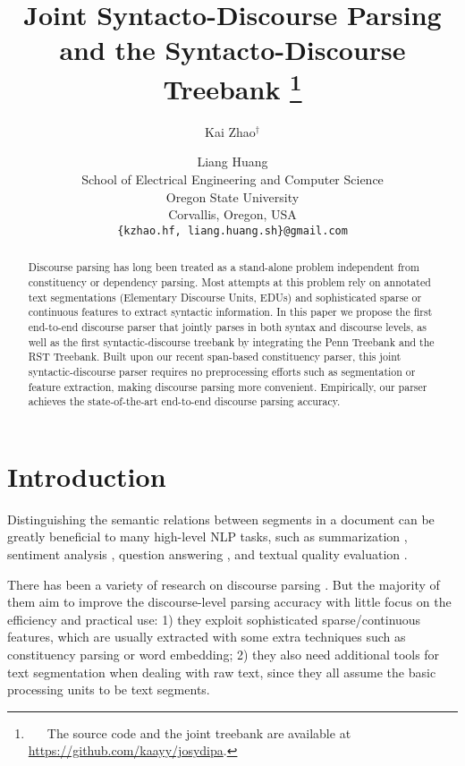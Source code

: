 \documentclass[11pt,letterpaper]{article}
\title{Joint Syntacto-Discourse Parsing and the Syntacto-Discourse Treebank
\thanks{\ \ \ The source code and the joint treebank are available
  at \url{https://github.com/kaayy/josydipa}.}}
\author{Kai Zhao$^\dagger$ \and Liang Huang \\
  School of Electrical Engineering and Computer Science\\
  Oregon State University\\
  Corvallis, Oregon, USA\\
  {\tt \{kzhao.hf, liang.huang.sh\}@gmail.com}
}
\date{}
\makeatletter
\def\blfootnote{\gdef\@thefnmark{}\@footnotetext}
\makeatother
\begin{document}
\maketitle

\begin{abstract}
  Discourse parsing has long been treated as a stand-alone problem
  independent from constituency or dependency parsing. 
  Most attempts at this problem rely on annotated text segmentations
  (Elementary Discourse Units, EDUs) and sophisticated sparse or continuous features
   to extract syntactic information.
  In this paper we propose the first end-to-end discourse parser
  that jointly parses in both syntax and discourse levels,
  as well as the first syntactic-discourse treebank by integrating 
  the Penn Treebank and the RST Treebank.
  Built upon our recent span-based constituency parser,
  this joint syntactic-discourse parser requires no preprocessing efforts such as segmentation or feature
  extraction, making discourse parsing more convenient.
  Empirically, our parser achieves the state-of-the-art end-to-end discourse parsing accuracy.
\end{abstract}

\blfootnote{$^\dagger$ Current address: Google Inc., 
New York, NY, USA}

\section{Introduction}\label{sec:intro}

Distinguishing the semantic relations between segments in a document
 can be greatly beneficial to many high-level NLP tasks,
such as summarization \cite{louis2010discourse,yoshida2014dependency}, sentiment analysis \cite{voll2007not,somasundaran2009supervised,bhatia2015better},
question answering \cite{ferrucci2010building,jansen2014discourse}, and textual quality evaluation \cite{tetreault2013holistic,li2016neural}.

There has been a variety of research on discourse parsing 
\cite{marcu2000rhetorical,soricut2003sentence,pardo2008development,hernault2010hilda,da2012symbolic,joty2013combining,joty2014discriminative,feng2014linear,ji2014representation,li2014recursive,li2014text,heilman2015fast,wang2017two}.
But the majority of them aim to improve the discourse-level parsing accuracy
with little focus on the efficiency and practical use:
1) they exploit sophisticated sparse/continuous features,
which are usually extracted with some extra techniques such
as constituency parsing or word embedding;
2) they also need additional tools for text segmentation when dealing with raw text,
since they all assume the basic processing units to be text segments.
\end{document}
